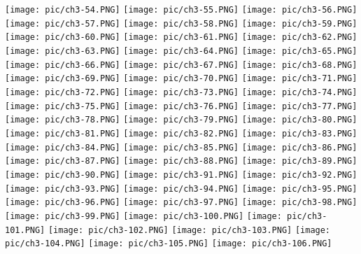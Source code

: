 \documentclass[UTF-8]{ctexart}
\begin{document}
\begin{center}
    \texttt{[image: pic/ch3-54.PNG]}
    \texttt{[image: pic/ch3-55.PNG]}
    \texttt{[image: pic/ch3-56.PNG]}
    \texttt{[image: pic/ch3-57.PNG]}
    \texttt{[image: pic/ch3-58.PNG]}
    \texttt{[image: pic/ch3-59.PNG]}
    \texttt{[image: pic/ch3-60.PNG]}
    \texttt{[image: pic/ch3-61.PNG]}
    \texttt{[image: pic/ch3-62.PNG]}
    \texttt{[image: pic/ch3-63.PNG]}
    \texttt{[image: pic/ch3-64.PNG]}
    \texttt{[image: pic/ch3-65.PNG]}
    \texttt{[image: pic/ch3-66.PNG]}
    \texttt{[image: pic/ch3-67.PNG]}
    \texttt{[image: pic/ch3-68.PNG]}
    \texttt{[image: pic/ch3-69.PNG]}
    \texttt{[image: pic/ch3-70.PNG]}
    \texttt{[image: pic/ch3-71.PNG]}
    \texttt{[image: pic/ch3-72.PNG]}
    \texttt{[image: pic/ch3-73.PNG]}
    \texttt{[image: pic/ch3-74.PNG]}
    \texttt{[image: pic/ch3-75.PNG]}
    \texttt{[image: pic/ch3-76.PNG]}
    \texttt{[image: pic/ch3-77.PNG]}
    \texttt{[image: pic/ch3-78.PNG]}
    \texttt{[image: pic/ch3-79.PNG]}
    \texttt{[image: pic/ch3-80.PNG]}
    \texttt{[image: pic/ch3-81.PNG]}
    \texttt{[image: pic/ch3-82.PNG]}
    \texttt{[image: pic/ch3-83.PNG]}
    \texttt{[image: pic/ch3-84.PNG]}
    \texttt{[image: pic/ch3-85.PNG]}
    \texttt{[image: pic/ch3-86.PNG]}
    \texttt{[image: pic/ch3-87.PNG]}
    \texttt{[image: pic/ch3-88.PNG]}
    \texttt{[image: pic/ch3-89.PNG]}
    \texttt{[image: pic/ch3-90.PNG]}
    \texttt{[image: pic/ch3-91.PNG]}
    \texttt{[image: pic/ch3-92.PNG]}
    \texttt{[image: pic/ch3-93.PNG]}
    \texttt{[image: pic/ch3-94.PNG]}
    \texttt{[image: pic/ch3-95.PNG]}
    \texttt{[image: pic/ch3-96.PNG]}
    \texttt{[image: pic/ch3-97.PNG]}
    \texttt{[image: pic/ch3-98.PNG]}
    \texttt{[image: pic/ch3-99.PNG]}
    \texttt{[image: pic/ch3-100.PNG]}
    \texttt{[image: pic/ch3-101.PNG]}
    \texttt{[image: pic/ch3-102.PNG]}
    \texttt{[image: pic/ch3-103.PNG]}
    \texttt{[image: pic/ch3-104.PNG]}
    \texttt{[image: pic/ch3-105.PNG]}
    \texttt{[image: pic/ch3-106.PNG]}

\end{center}
\end{document}
